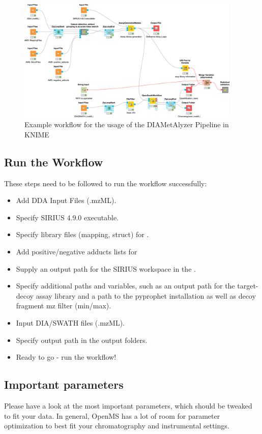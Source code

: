 \begin{figure}[!h]
  \centering
  \includegraphics[width=0.95\textwidth]{graphics/openswathmetabo/oswm_example_wf.png}
  \caption{Example workflow for the usage of the DIAMetAlyzer Pipeline in KNIME}
  \label{fig:oswm_example_wf}
\end{figure}

\subsection{Run the Workflow}
These steps need to be followed to run the workflow successfully:

\begin{itemize}
\item Add DDA Input Files (.mzML).
\item Specify SIRIUS 4.9.0 executable.
\item Specify library files (mapping, struct) for .
\item Add positive/negative adducts lists for 
\item Supply an output path for the SIRIUS workspace in the .
\item Specify additional paths and variables, such as an output path for the target-decoy assay library and a path to the pyprophet installation as well as decoy fragment mz filter (min/max).
\item Input DIA/SWATH files (.mzML).
\item Specify output path in the output folders.
\item Ready to go - run the workflow! 
\end{itemize}

\subsection{Important parameters}
\noindent Please have a look at the most important parameters, which should be tweaked to fit your data. In general, OpenMS has a lot of room for parameter optimization to best fit your chromatography and instrumental settings. \\

